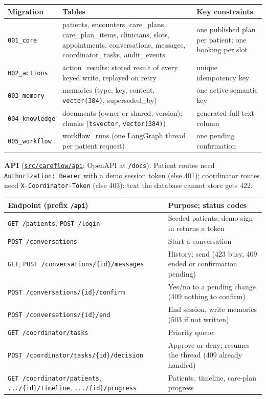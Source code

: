 \documentclass[10pt,a4paper]{article}
\newcommand{\repourl}{https://github.com/saideepaksana/careflow}
\newcommand{\rev}{cs5903-final-2026}
\newcommand{\dir}[1]{\href{\repourl/tree/\rev/#1}{\nolinkurl{#1}}}
\begin{document}
\begin{table}[htbp]
\centering
\footnotesize
\begin{tabularx}{\textwidth}{P{2.4cm} L P{3.9cm}}
\toprule
\textbf{Migration} & \textbf{Tables} & \textbf{Key constraints} \\
\midrule
\texttt{001\_core} & patients, encounters, care\_plans, care\_plan\_items, clinicians, slots, appointments, conversations, messages, coordinator\_tasks, audit\_events & one published plan per patient; one booking per slot \\
\texttt{002\_actions} & action\_results: stored result of every keyed write, replayed on retry & unique idempotency key \\
\texttt{003\_memory} & memories (type, key, content, \texttt{vector(384)}, superseded\_by) & one active semantic key \\
\texttt{004\_knowledge} & documents (owner or shared, version); chunks (\texttt{tsvector}, \texttt{vector(384)}) & generated full-text column \\
\texttt{005\_workflow} & workflow\_runs (one LangGraph thread per patient request) & one pending confirmation \\
\bottomrule
\end{tabularx}
\end{table}

\textbf{API} (\dir{src/careflow/api}; OpenAPI at \texttt{/docs}). Patient routes need \texttt{Authorization: Bearer} with a demo session token (else 401); coordinator routes need \texttt{X-Coordinator-Token} (else 403); text the database cannot store gets 422.

\begin{table}[htbp]
\centering
\footnotesize
\begin{tabularx}{\textwidth}{P{7.6cm} L}
\toprule
\textbf{Endpoint (prefix \texttt{/api})} & \textbf{Purpose; status codes} \\
\midrule
\texttt{GET /patients}, \texttt{POST /login} & Seeded patients; demo sign-in returns a token \\
\texttt{POST /conversations} & Start a conversation \\
\texttt{GET}, \texttt{POST /conversations/\{id\}/messages} & History; send (423 busy, 409 ended or confirmation pending) \\
\texttt{POST /conversations/\{id\}/confirm} & Yes/no to a pending change (409 nothing to confirm) \\
\texttt{POST /conversations/\{id\}/end} & End session, write memories (503 if not written) \\
\texttt{GET /coordinator/tasks} & Priority queue \\
\texttt{POST /coordinator/tasks/\{id\}/decision} & Approve or deny; resumes the thread (409 already handled) \\
\texttt{GET /coordinator/patients}, \texttt{.../\{id\}/timeline}, \texttt{.../\{id\}/progress} & Patients, timeline, care-plan progress \\
\bottomrule
\end{tabularx}
\end{table}
\end{document}

